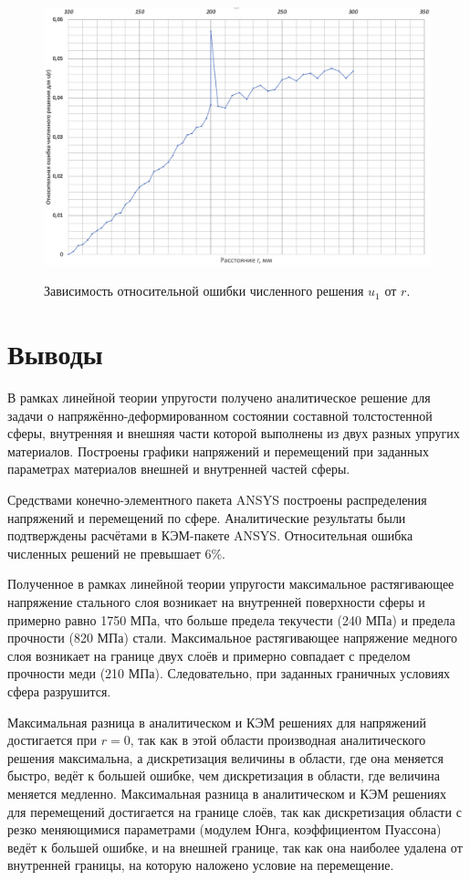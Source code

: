 \documentclass[a4paper,12pt]{article}	%
\begin{document}
\begin{figure}[H]
  \centering
  \includegraphics[scale=0.5]{img/error_u.png}\\
  \caption{Зависимость относительной ошибки численного решения $u_1$ от $r$.}
  \label{fig_19}
\end{figure}

\newpage

\Large
\section{Выводы}

\normalsize
В рамках линейной теории упругости получено аналитическое решение для задачи о напряжённо-деформированном состоянии составной толстостенной сферы, внутренняя и внешняя части которой выполнены из двух разных упругих материалов. Построены графики напряжений и перемещений при заданных параметрах материалов внешней и внутренней частей сферы.

Средствами конечно-элементного пакета ANSYS построены распределения напряжений и перемещений по сфере. Аналитические результаты были подтверждены расчётами в КЭМ-пакете ANSYS. Относительная ошибка численных решений не превышает $6\%$.

Полученное в рамках линейной теории упругости максимальное растягивающее напряжение стального слоя возникает на внутренней поверхности сферы и примерно равно 1750 МПа, что больше предела текучести (240 МПа) и предела прочности (820 МПа) стали.
Максимальное растягивающее напряжение медного слоя возникает на границе двух слоёв и примерно совпадает с пределом прочности меди (210 МПа). Следовательно, при заданных граничных условиях сфера разрушится.

Максимальная разница в аналитическом и КЭМ решениях для напряжений достигается при $r=0$, так как в этой области производная аналитического решения максимальна, а дискретизация величины в области, где она меняется быстро, ведёт к большей ошибке, чем дискретизация в области, где величина меняется медленно.
Максимальная разница в аналитическом и КЭМ решениях для перемещений достигается на границе слоёв, так как дискретизация области с резко меняющимися параметрами (модулем Юнга, коэффициентом Пуассона) ведёт к большей ошибке, и на внешней границе, так как она наиболее удалена от внутренней границы, на которую наложено условие на перемещение.
\end{document}
